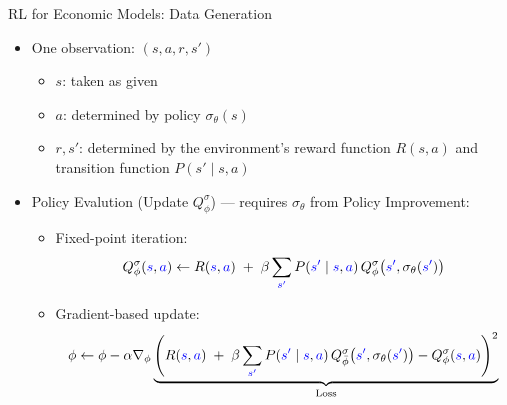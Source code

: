 \documentclass[aspectratio=169]{beamer}
\newcommand{\1}{\mathbf{1}}
\begin{document}

\begin{frame}{RL for Economic Models: Data Generation}
  \begin{itemize}
      \item One observation: $(s, a, r, s')$
        \begin{itemize}
            \item $s$: taken as given
            \item $a$: determined by policy $\sigma_\theta(s)$
            \item $r, s'$: determined by the environment's reward function $R(s, a)$ and transition function $P(s' \mid s, a)$
        \end{itemize}
      \item Policy Evalution (Update $Q_\phi^\sigma$) --- requires $\sigma_\theta$ from Policy Improvement:
        \begin{itemize}
          \item Fixed-point iteration:
          $$Q_\phi^\sigma(\textcolor{blue}{s}, \textcolor{blue}{a}) \leftarrow R(\textcolor{blue}{s},\textcolor{blue}{a}) \;+\; \beta \sum_{\textcolor{blue}{s'}} P(\textcolor{blue}{s'} \mid \textcolor{blue}{s},\textcolor{blue}{a})\, Q_\phi^\sigma\big(\textcolor{blue}{s'}, \sigma_\theta(\textcolor{blue}{s'})\big)$$
          \item Gradient-based update:
          \begin{align*}
            \phi \leftarrow \phi - \alpha \nabla_\phi \underbrace{\left( R(\textcolor{blue}{s},\textcolor{blue}{a}) \;+\; \beta \sum_{\textcolor{blue}{s'}} P(\textcolor{blue}{s'} \mid \textcolor{blue}{s},\textcolor{blue}{a})\, Q_{\bar{\phi}}^\sigma\big(\textcolor{blue}{s'}, \sigma_\theta(\textcolor{blue}{s'})\big) - Q_\phi^\sigma(\textcolor{blue}{s}, \textcolor{blue}{a}) \right)^2}_{\text{Loss}}
          \end{align*}
        \end{itemize}
  \end{itemize}
\end{frame}
\end{document}
